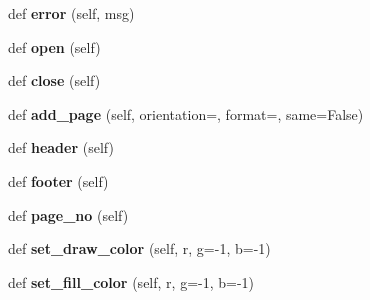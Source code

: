 \begin{DoxyCompactItemize}
\item 
def {\bfseries error} (self, msg)\hypertarget{class_libraries_1_1fpdf_1_1fpdf_1_1_f_p_d_f_a16b24db8f0cc372855092f85ec6b5305}{}\label{class_libraries_1_1fpdf_1_1fpdf_1_1_f_p_d_f_a16b24db8f0cc372855092f85ec6b5305}

\item 
def {\bfseries open} (self)\hypertarget{class_libraries_1_1fpdf_1_1fpdf_1_1_f_p_d_f_a56a8f9393241eeb01bc5a3f74fb369f7}{}\label{class_libraries_1_1fpdf_1_1fpdf_1_1_f_p_d_f_a56a8f9393241eeb01bc5a3f74fb369f7}

\item 
def {\bfseries close} (self)\hypertarget{class_libraries_1_1fpdf_1_1fpdf_1_1_f_p_d_f_a52b93479702db80f74337ad3d88ddc7b}{}\label{class_libraries_1_1fpdf_1_1fpdf_1_1_f_p_d_f_a52b93479702db80f74337ad3d88ddc7b}

\item 
def {\bfseries add\+\_\+page} (self, orientation=\textquotesingle{}\textquotesingle{}, format=\textquotesingle{}\textquotesingle{}, same=False)\hypertarget{class_libraries_1_1fpdf_1_1fpdf_1_1_f_p_d_f_a10b71c8433fab7494951fc0ea7697159}{}\label{class_libraries_1_1fpdf_1_1fpdf_1_1_f_p_d_f_a10b71c8433fab7494951fc0ea7697159}

\item 
def {\bfseries header} (self)\hypertarget{class_libraries_1_1fpdf_1_1fpdf_1_1_f_p_d_f_a01db6f784bfbcbccc9a8ddffc55adb53}{}\label{class_libraries_1_1fpdf_1_1fpdf_1_1_f_p_d_f_a01db6f784bfbcbccc9a8ddffc55adb53}

\item 
def {\bfseries footer} (self)\hypertarget{class_libraries_1_1fpdf_1_1fpdf_1_1_f_p_d_f_ad8dd8458b819a657aa3be9f3ce94c285}{}\label{class_libraries_1_1fpdf_1_1fpdf_1_1_f_p_d_f_ad8dd8458b819a657aa3be9f3ce94c285}

\item 
def {\bfseries page\+\_\+no} (self)\hypertarget{class_libraries_1_1fpdf_1_1fpdf_1_1_f_p_d_f_abd156337e6d9f732d901a9cebd79a5a8}{}\label{class_libraries_1_1fpdf_1_1fpdf_1_1_f_p_d_f_abd156337e6d9f732d901a9cebd79a5a8}

\item 
def {\bfseries set\+\_\+draw\+\_\+color} (self, r, g=-\/1, b=-\/1)\hypertarget{class_libraries_1_1fpdf_1_1fpdf_1_1_f_p_d_f_aa15dbff18b4aa16cc6c9c8c88a58b58b}{}\label{class_libraries_1_1fpdf_1_1fpdf_1_1_f_p_d_f_aa15dbff18b4aa16cc6c9c8c88a58b58b}

\item 
def {\bfseries set\+\_\+fill\+\_\+color} (self, r, g=-\/1, b=-\/1)\hypertarget{class_libraries_1_1fpdf_1_1fpdf_1_1_f_p_d_f_a19b01b04bc8ef53459b0bc30e029dc5a}{}\label{class_libraries_1_1fpdf_1_1fpdf_1_1_f_p_d_f_a19b01b04bc8ef53459b0bc30e029dc5a}


\end{DoxyCompactItemize}
